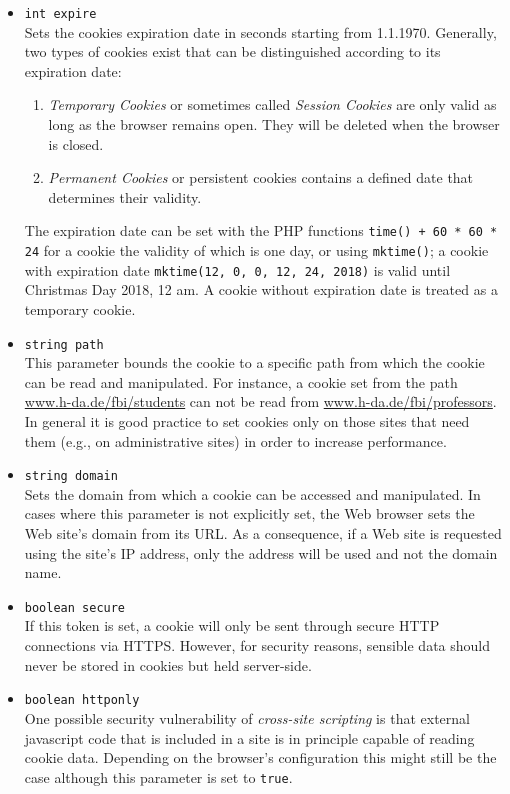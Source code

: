 \documentclass[a4paper, justified, notoc]{tufte-handout} %
\begin{document}
\begin{itemize}
	\item \texttt{int expire} \\Sets the cookies expiration date in seconds starting from 1.1.1970. Generally, two types of cookies exist that can be distinguished according to its expiration date: 
	\begin{enumerate}
		\item \emph{Temporary Cookies} or sometimes called \emph{Session Cookies} are only valid as long as the browser remains open. They will be deleted when the browser is closed.
		\item \emph{Permanent Cookies} or persistent cookies contains a defined date that determines their validity.
	\end{enumerate}
	The expiration date can be set with the PHP functions \texttt{time() + 60 * 60 * 24} for a cookie the validity of which is one day, or using \texttt{mktime()}; a cookie with expiration date \texttt{mktime(12, 0, 0, 12, 24, 2018)} is valid until Christmas Day 2018, 12 am.
	A cookie without expiration date is treated as a temporary cookie.
	
	\item \texttt{string path} \\ This parameter bounds the cookie to a specific path from which the cookie can be read and manipulated. For instance, a cookie set from the path \url{www.h-da.de/fbi/students} can not be read from \url{www.h-da.de/fbi/professors}. 
	In general it is good practice to set cookies only on those sites that need them (e.g., on administrative sites) in order to increase performance. 
	
	\item \texttt{string domain} \\ Sets the domain from which a cookie can be accessed and manipulated. In cases where this parameter is not explicitly set, the Web browser sets the Web site's domain from its URL. As a consequence, if a Web site is requested using the site's IP address, only the address will be used and not the domain name. 
	
	\item \texttt{boolean secure} \\ If this token is set, a cookie will only be sent through secure HTTP connections via HTTPS. However, for security reasons, sensible data should never be stored in cookies but held server-side. 
	
	\item \texttt{boolean httponly} \\ One possible security vulnerability of \emph{cross-site scripting} is that external javascript code that is included in a site is in principle capable of reading cookie data. Depending on the browser's configuration this might still be the case although this parameter is set to \texttt{true}. 
	
\end{itemize}
\end{document}
